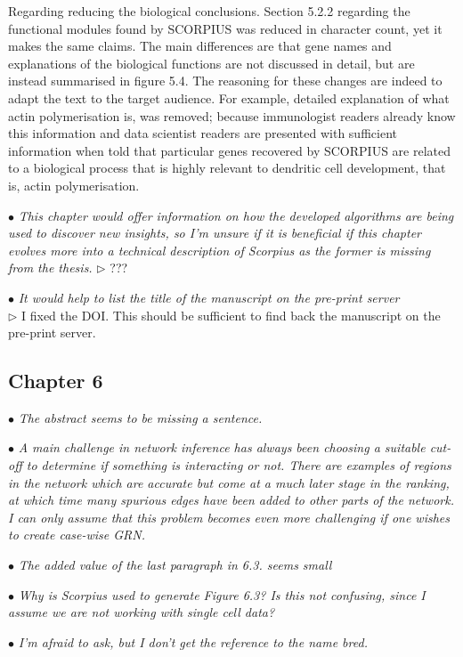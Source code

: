 \documentclass[10pt]{article}
\newcommand{\exam}[2][\  ]{\hspace{0pt}\marginpar{\color{red}#1}$\bullet$ \textit{#2}}
\newcommand{\imp}[1]{{\color{red} #1}}
\newcommand{\answ}[1]{{\color{blue} $\triangleright$ #1}}
\begin{document}
{{Regarding reducing the biological conclusions. Section 5.2.2 regarding the functional modules found by SCORPIUS was reduced in character count, yet it makes the same claims. The main differences are that gene names and explanations of the biological functions are not discussed in detail, but are instead summarised in figure 5.4. The reasoning for these changes are indeed to adapt the text to the target audience.
For example, detailed explanation of what actin polymerisation is, was removed; because immunologist readers already know this information and data scientist readers are presented with sufficient information when told that particular genes recovered by SCORPIUS are related to a biological process that is highly relevant to dendritic cell development, that is, actin polymerisation.}



\exam{This chapter would offer information on how the developed algorithms
	are being used to discover new insights, so I’m unsure if it is beneficial if this
	chapter evolves more into a technical description of Scorpius as the former is
	missing from the thesis.}
\answ{???}


\exam{It would help to list the title of the manuscript on the pre-print server} \\
\answ{I fixed the DOI. This should be sufficient to find back the manuscript on the pre-print server.}


\subsection{Chapter 6}

\exam{The abstract seems to be missing a sentence.}


\exam{\imp{A main challenge in network inference has always been choosing a suitable
		cut-off to determine if something is interacting or not.} There are examples of
		regions in the network which are accurate but come at a much later stage in
		the ranking, at which time many spurious edges have been added to other
		parts of the network. I can only assume that this problem becomes even more
		challenging if one wishes to create case-wise GRN.}
	

\exam{The added value of the last paragraph in 6.3. seems small}

\exam{Why is Scorpius used to generate Figure 6.3? Is this not confusing, since I
		assume we are not working with single cell data?}

\exam{I’m afraid to ask, but I don’t get the reference to the name bred.}
 

}
\end{document}
